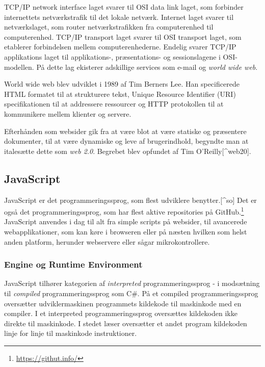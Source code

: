\documentclass[]{article}
\begin{document}
TCP/IP network interface laget svarer til OSI data link laget, som
forbinder internettets netværkstrafik til det lokale netværk. Internet
laget svarer til netværkslaget, som router netværkstrafikken fra
computerenhed til computerenhed. TCP/IP transport laget svarer til OSI
transport laget, som etablerer forbindelsen mellem computerenhederne.
Endelig svarer TCP/IP applikations laget til applikations-,
præsentations- og sessionslagene i OSI-modellen. På dette lag ekisterer
adskillige services som e-mail og \emph{world wide web}.

World wide web blev udviklet i 1989 af Tim Berners Lee. Han
specificerede HTML formatet til at strukturere tekst, Unique Resource
Identifier (URI) specifikationen til at addressere ressourcer og HTTP
protokollen til at kommunikere mellem klienter og servere.

Efterhånden som websider gik fra at være blot at være statiske og
præsentere dokumenter, til at være dynamiske og leve af brugerindhold,
begyndte man at italesætte dette som \emph{web 2.0}. Begrebet blev
opfundet af Tim O'Reilly{[}\^{}web20{]}.

\hypertarget{javascript}{%
\subsection{JavaScript}\label{javascript}}

JavaScript er det programmeringssprog, som flest udviklere
benytter.{[}\^{}so{]} Det er også det programmeringssprog, som har flest
aktive repositories på GitHub.\footnote{\url{https://githut.info/}}
JavaScript anvendes i dag til alt fra simple scripts på websider, til
avancerede webapplikationer, som kan køre i browseren eller på næsten
hvilken som helst anden platform, herunder webservere eller sågar
mikrokontrollere.

\hypertarget{engine-og-runtime-environment}{%
\subsubsection{Engine og Runtime
Environment}\label{engine-og-runtime-environment}}

JavaScript tilhører kategorien af \emph{interpreted} programmeringssprog
- i modsætning til \emph{compiled} programmeringssprog som C\#. På et
compiled programmeringssprog oversætter udviklermaskinen programmets
kildekode til maskinkode med en compiler. I et interpreted
programmeringssprog oversættes kildekoden ikke direkte til maskinkode. I
stedet læser oversætter et andet program kildekoden linje for linje til
maskinkode instruktioner.
\end{document}
